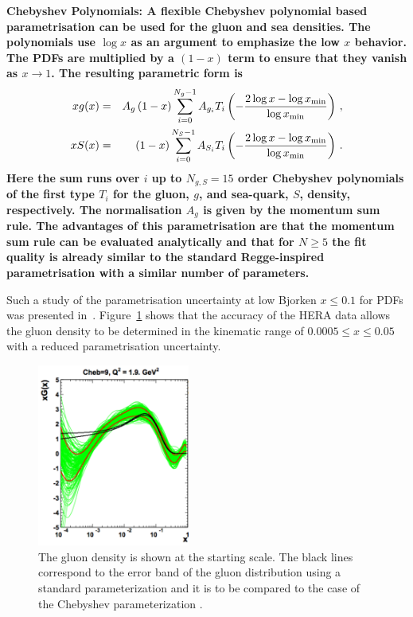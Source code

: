 \begin{description}
\item \bf {Chebyshev Polynomials:} \rm
A flexible Chebyshev polynomial based parametrisation can be used for the gluon and sea densities. The polynomials
use $\log x$ as an argument to emphasize the low $x$ behavior. 
The PDFs are multiplied
by a $(1-x)$ term to ensure that they vanish as $x\to 1$. The resulting parametric form is 
\begin{eqnarray}
x g(x) &=& A_g \left(1-x\right) \sum_{i=0}^{N_g-1} A_{g_i} T_i \left(-\frac{\textstyle 2\log x - \log x_{\rm min} } {\textstyle \log x_{\rm min} } \right)\,, \label{eq:glu} \\
x S(x) &=& \left(1-x\right) \sum_{i=0}^{N_S-1} A_{S_i} T_i \left(-\frac{\textstyle 2\log x - \log x_{\rm min} } {\textstyle \log x_{\rm min} } \right)\,. \label{eq:sea} 
\end{eqnarray}
Here the sum runs over $i$ up to $N_{g,S}=15$ order Chebyshev polynomials of the first type $T_i$ for
the gluon, $g$, and sea-quark, $S$, density, respectively. 
The normalisation $A_g$ is given by the momentum sum rule.
%
The advantages of this parametrisation are that the momentum sum rule can be evaluated analytically 
and that for $N \ge 5$ the fit quality is already similar
to the standard Regge-inspired parametrisation with a similar number of parameters.

Such a study of the parametrisation uncertainty at low Bjorken $x \le 0.1$ for PDFs was presented 
in~\cite{Chebyshev}. Figure~\ref{fig:cheb} shows that the accuracy of 
the HERA data allows the gluon density to be  determined in the kinematic range of $0.0005 \le x \le 0.05$ 
with a reduced parametrisation uncertainty. 
\begin{figure}[!ht]
 \centering
  \includegraphics[width=5cm]{chebishev.pdf}
  \caption{The gluon density is shown at the starting scale. The black lines correspond to the error band of the gluon distribution using a standard parameterization and it is to be compared to the case of the Chebyshev parameterization \cite{Chebyshev}.}
 \label{fig:cheb}
\end{figure}


\end{description}
